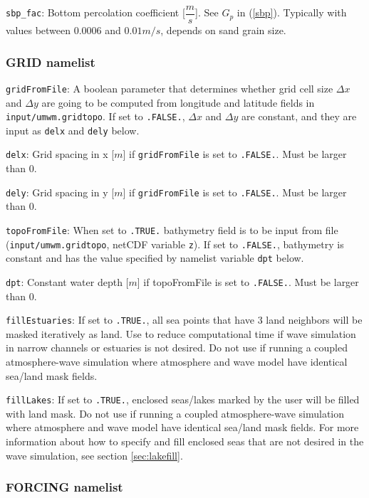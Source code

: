 \documentclass[letterpaper]{article}
\numberwithin{equation}{section}
\begin{document}
\verb+sbp_fac+:
Bottom percolation coefficient [$\dfrac{m}{s}$].
See $G_{p}$ in (\ref{sbp}).
Typically with values between $0.0006$ and $0.01 m/s$,
depends on sand grain size.

\subsubsection{GRID namelist}
\label{sec:grid_namelist}

\verb+gridFromFile+:
A boolean parameter that determines whether grid cell size
$\Delta x$ and $\Delta y$ are going to be computed from 
longitude and latitude fields in \verb+input/umwm.gridtopo+. 
If set to \verb+.FALSE.+, $\Delta x$ and $\Delta y$ are constant,
and they are input as \verb+delx+ and \verb+dely+ below.

\verb+delx+:
Grid spacing in x [$m$] if \verb+gridFromFile+ is set to \verb+.FALSE.+.
Must be larger than $0$.

\verb+dely+:
Grid spacing in y [$m$] if \verb+gridFromFile+ is set to \verb+.FALSE.+.
Must be larger than $0$.  
  
\verb+topoFromFile+:
When set to \verb+.TRUE.+ bathymetry field
is to be input from file (\verb+input/umwm.gridtopo+, netCDF variable \verb+z+).
If set to \verb+.FALSE.+, bathymetry is constant and has the value
specified by namelist variable \verb+dpt+ below.

\verb+dpt+:
Constant water depth [$m$] if topoFromFile is set to \verb+.FALSE.+.
Must be larger than $0$.

\verb+fillEstuaries+:
If set to \verb+.TRUE.+, all sea points that have 3 land neighbors 
will be masked iteratively as land.
Use to reduce computational time if wave simulation in narrow channels 
or estuaries is not desired.
Do not use if running a coupled atmosphere-wave simulation where
atmosphere and wave model have identical sea/land mask fields.

\verb+fillLakes+:
If set to \verb+.TRUE.+, enclosed seas/lakes marked by the user will
be filled with land mask.
Do not use if running a coupled atmosphere-wave simulation where
atmosphere and wave model have identical sea/land mask fields.
For more information about how to specify and fill enclosed seas 
that are not desired in the wave simulation, see section \ref{sec:lakefill}.

\subsubsection{FORCING namelist}
\end{document}

